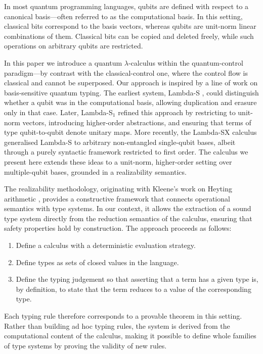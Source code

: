 \documentclass[runningheads,orivec]{llncs}
\begin{document}
In most quantum programming languages, qubits are defined with respect to a
canonical basis—often referred to as the computational basis. In this setting,
classical bits correspond to the basis vectors, whereas qubits are unit-norm
linear combinations of them. Classical bits can be copied and deleted freely,
while such operations on arbitrary qubits are restricted.

In this paper we introduce a quantum $\lambda$-calculus within the
quantum-control paradigm—by contrast with the classical-control one, where the
control flow is classical and cannot be superposed. Our approach is inspired by
a line of work on basis-sensitive quantum typing. The earliest system,
Lambda-S \cite{DiazcaroDowekRinaldiBIO19}, could distinguish whether a qubit
was in the computational basis, allowing duplication and erasure only in that
case. Later, Lambda-S$_1$
\cite{DiazcaroGuillermoMiquelValironLICS19,DiazCaroMalherbe2022} refined this
approach by restricting to unit-norm vectors, introducing higher-order
abstractions, and ensuring that terms of type qubit-to-qubit denote unitary
maps. More recently, the Lambda-SX calculus \cite{DiazcaroMonzonAPLAS25}
generalised Lambda-S to arbitrary non-entangled single-qubit bases, albeit
through a purely syntactic framework restricted to first order. The calculus we
present here extends these ideas to a unit-norm, higher-order setting over
multiple-qubit bases, grounded in a realizability semantics.

The realizability methodology, originating with Kleene's work on Heyting
arithmetic \cite{KleeneJSL45}, provides a constructive framework that connects
operational semantics with type systems. In our context, it allows the
extraction of a sound type system directly from the reduction semantics of the
calculus, ensuring that safety properties hold by construction. The approach
proceeds as follows:
\begin{enumerate}
  \item Define a calculus with a deterministic evaluation strategy.
  \item Define types as sets of closed values in the language.
  \item Define the typing judgement so that asserting that a term has a given
  type is, by definition, to state that the term reduces to a value of the
  corresponding type.
\end{enumerate}
Each typing rule therefore corresponds to a provable theorem in this setting.
Rather than building ad hoc typing rules, the system is derived from the
computational content of the calculus, making it possible to define whole
families of type systems by proving the validity of new rules.
\end{document}
